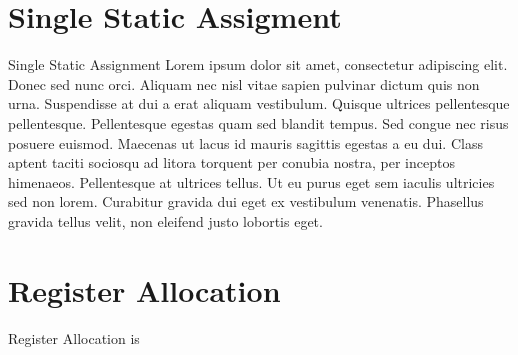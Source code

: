 \section{Single Static Assigment}
\label{sec:ssa}
Single Static Assignment
Lorem ipsum dolor sit amet, consectetur adipiscing elit. Donec sed nunc orci. Aliquam nec nisl vitae sapien pulvinar dictum quis non urna. Suspendisse at dui a erat aliquam vestibulum. Quisque ultrices pellentesque pellentesque. Pellentesque egestas quam sed blandit tempus. Sed congue nec risus posuere euismod. Maecenas ut lacus id mauris sagittis egestas a eu dui. Class aptent taciti sociosqu ad litora torquent per conubia nostra, per inceptos himenaeos. Pellentesque at ultrices tellus. Ut eu purus eget sem iaculis ultricies sed non lorem. Curabitur gravida dui eget ex vestibulum venenatis. Phasellus gravida tellus velit, non eleifend justo lobortis eget.

\section{Register Allocation}
\label{sec:ra}
Register Allocation is

